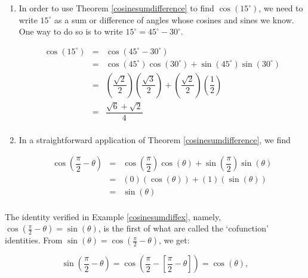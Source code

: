 {\begin{enumerate}

\item In order to use Theorem \ref{cosinesumdifference} to find $\cos\left(15^{\circ}\right)$, we need to write $15^{\circ}$ as a sum or difference of angles whose cosines and sines we know.  One way to do so is to write $15^{\circ} = 45^{\circ} - 30^{\circ}$.


\[ \begin{array}{rcl}

\cos\left(15^{\circ}\right) & = & \cos\left(45^{\circ} - 30^{\circ} \right) \\ [2pt]
                            & = & \cos\left(45^{\circ}\right)\cos\left(30^{\circ} \right) + \sin\left(45^{\circ}\right)\sin\left(30^{\circ} \right) \\ [2pt]
                            & = & \left( \dfrac{\sqrt{2}}{2} \right)\left( \dfrac{\sqrt{3}}{2} \right)  +  \left( \dfrac{\sqrt{2}}{2} \right)\left( \dfrac{1}{2} \right)\\ [15pt]
														& = &  \dfrac{\sqrt{6}+ \sqrt{2}}{4} \\ 
\end{array} \]

\item  In a straightforward application of  Theorem \ref{cosinesumdifference}, we find

\[ \begin{array}{rcl}

\cos\left(\dfrac{\pi}{2} - \theta\right) & = & \cos\left(\dfrac{\pi}{2}\right)\cos\left(\theta\right) + \sin\left(\dfrac{\pi}{2}\right)\sin\left(\theta \right) \\ [10pt]
                            & = & \left( 0 \right)\left( \cos(\theta) \right)  +  \left( 1 \right)\left( \sin(\theta) \right) \\ [4pt]
														& = & \sin(\theta)    \\
\end{array} \]


\end{enumerate}
}

\medskip


The identity verified in Example \ref{cosinesumdiffex}, namely, $\cos\left(\frac{\pi}{2} - \theta\right) = \sin(\theta)$,  is the first of what are called the `cofunction' identities.   From $ \sin(\theta) = \cos\left(\frac{\pi}{2} - \theta\right) $, we get:

\[ \sin\left(\dfrac{\pi}{2} - \theta\right) = \cos\left(\dfrac{\pi}{2} -\left[\dfrac{\pi}{2} - \theta\right]\right) = \cos(\theta),\]


